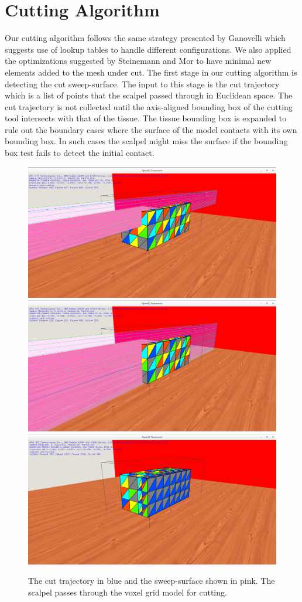 \section{Cutting Algorithm}
Our cutting algorithm follows the same strategy presented by Ganovelli \etal \cite{Ganovelli2000} which suggests use of lookup tables to 
handle different configurations. We also applied the optimizations suggested by
Steinemann and Mor \etal \cite{Steinemann, Mor2000} to have minimal new elements added to the mesh under cut. 
The first stage in our cutting algorithm is detecting the cut sweep-surface. The input to this stage is the cut trajectory which is a list of points
that the scalpel passed through in Euclidean space. The cut trajectory is not collected until the axis-aligned bounding box of the cutting tool intersects
with that of the tissue. The tissue bounding box is expanded to rule out the boundary cases where the surface of the model contacts with its own bounding 
box. In such cases the scalpel might miss the surface if the bounding box test fails to detect the initial contact. 

\begin{figure}[H]
  \centering
  \includegraphics[width=0.6\linewidth]{figures/cutting/cubecut02.png}
  \includegraphics[width=0.6\linewidth]{figures/cutting/cubecut04.png}
  \includegraphics[width=0.6\linewidth]{figures/cutting/cubecut05.png}
  \caption{\label{fig:sweepsurf}
  {The cut trajectory in blue and the sweep-surface shown in pink. The scalpel passes through the voxel grid model for cutting.}
}
\end{figure}

